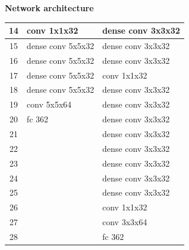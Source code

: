 \documentclass[xcolor=dvipsnames]{beamer}
\begin{document}
\begin{frame}{\bf Network architecture}
{\begin{table}[]
\begin{tabular}{|c|l|l|}
14             & \cellcolor[HTML]{38FFF8}conv 1x1x32       & \cellcolor[HTML]{FD6864}dense conv 3x3x32 \\ \hline
15             & \cellcolor[HTML]{FD6864}dense conv 5x5x32 & \cellcolor[HTML]{FD6864}dense conv 3x3x32 \\ \hline
16             & \cellcolor[HTML]{FD6864}dense conv 5x5x32 & \cellcolor[HTML]{FD6864}dense conv 3x3x32 \\ \hline
17             & \cellcolor[HTML]{FD6864}dense conv 5x5x32 & \cellcolor[HTML]{38FFF8}conv 1x1x32       \\ \hline
18             & \cellcolor[HTML]{FD6864}dense conv 5x5x32 & \cellcolor[HTML]{FD6864}dense conv 3x3x32 \\ \hline
19             & \cellcolor[HTML]{38FFF8}conv 5x5x64       & \cellcolor[HTML]{FD6864}dense conv 3x3x32 \\ \hline
20             & \cellcolor[HTML]{67FD9A}fc 362            & \cellcolor[HTML]{FD6864}dense conv 3x3x32 \\ \hline
21             &                                           & \cellcolor[HTML]{FD6864}dense conv 3x3x32 \\ \hline
22             &                                           & \cellcolor[HTML]{FD6864}dense conv 3x3x32 \\ \hline
23             &                                           & \cellcolor[HTML]{FD6864}dense conv 3x3x32 \\ \hline
24             &                                           & \cellcolor[HTML]{FD6864}dense conv 3x3x32 \\ \hline
25             &                                           & \cellcolor[HTML]{FD6864}dense conv 3x3x32 \\ \hline
26             &                                           & \cellcolor[HTML]{38FFF8}conv 1x1x32       \\ \hline
27             &                                           & \cellcolor[HTML]{38FFF8}conv 3x3x64       \\ \hline
28             &                                           & \cellcolor[HTML]{67FD9A}fc 362            \\ \hline
\end{tabular}
\end{table}
}


\end{frame}
\end{document}
